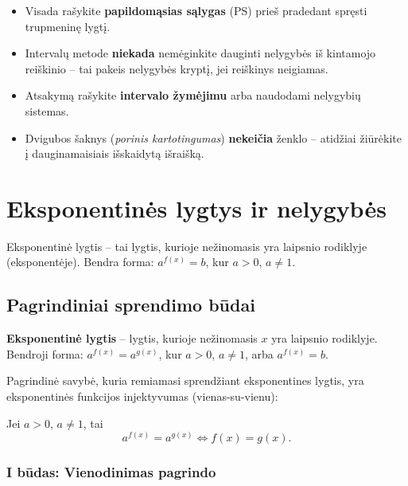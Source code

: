 \begin{tcolorbox}[title={VBE patarimai}, colback=green!5, colframe=green!60]
\begin{itemize}
    \item Visada rašykite \textbf{papildomąsias sąlygas} (PS) prieš pradedant spręsti trupmeninę lygtį.
    \item Intervalų metode \textbf{niekada} nemėginkite dauginti nelygybės iš kintamojo reiškinio -- tai pakeis nelygybės kryptį, jei reiškinys neigiamas.
    \item Atsakymą rašykite \textbf{intervalo žymėjimu} arba naudodami nelygybių sistemas.
    \item Dvigubos šaknys (\emph{porinis kartotingumas}) \textbf{nekeičia} ženklo -- atidžiai žiūrėkite į dauginamaisiais išskaidytą išraišką.
\end{itemize}
\end{tcolorbox}

\section{Eksponentinės lygtys ir nelygybės}

Eksponentinė lygtis – tai lygtis, kurioje nežinomasis yra laipsnio rodiklyje (eksponentėje). 
Bendra forma: $a^{f(x)} = b$, kur $a > 0$, $a \neq 1$.

\subsection{Pagrindiniai sprendimo būdai}

\begin{definition}
\textbf{Eksponentinė lygtis} – lygtis, kurioje nežinomasis $x$ yra laipsnio rodiklyje. 
Bendroji forma: $a^{f(x)} = a^{g(x)}$, kur $a > 0$, $a \neq 1$, arba $a^{f(x)} = b$.
\end{definition}

Pagrindinė savybė, kuria remiamasi sprendžiant eksponentines lygtis, yra eksponentinės 
funkcijos injektyvumas (vienas-su-vienu):

\begin{theorem}
Jei $a > 0$, $a \neq 1$, tai
\[
a^{f(x)} = a^{g(x)} \iff f(x) = g(x).
\]
\end{theorem}

\subsubsection*{I būdas: Vienodinimas pagrindo}

